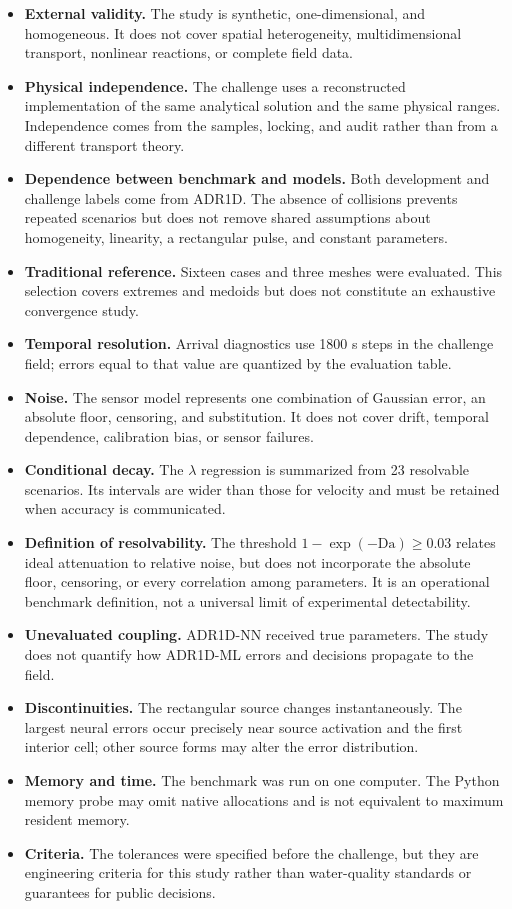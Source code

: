\documentclass[11pt,a4paper]{article}
\begin{document}
\begin{itemize}
    \item \textbf{External validity.} The study is synthetic,
    one-dimensional, and homogeneous. It does not cover spatial heterogeneity,
    multidimensional transport, nonlinear reactions, or complete field data.
    \item \textbf{Physical independence.} The challenge uses a reconstructed
    implementation of the same analytical solution and the same physical
    ranges. Independence comes from the samples, locking, and audit rather than
    from a different transport theory.
    \item \textbf{Dependence between benchmark and models.} Both development
    and challenge labels come from ADR1D. The absence of collisions prevents
    repeated scenarios but does not remove shared assumptions about
    homogeneity, linearity, a rectangular pulse, and constant parameters.
    \item \textbf{Traditional reference.} Sixteen cases and three meshes were
    evaluated. This selection covers extremes and medoids but does not
    constitute an exhaustive convergence study.
    \item \textbf{Temporal resolution.} Arrival diagnostics use 1800 s steps
    in the challenge field; errors equal to that value are quantized by the
    evaluation table.
    \item \textbf{Noise.} The sensor model represents one combination of
    Gaussian error, an absolute floor, censoring, and substitution. It does not
    cover drift, temporal dependence, calibration bias, or sensor failures.
    \item \textbf{Conditional decay.} The $\lambda$ regression is summarized
    from 23 resolvable scenarios. Its intervals are wider than those for
    velocity and must be retained when accuracy is communicated.
    \item \textbf{Definition of resolvability.} The threshold
    $1-\exp(-\mathrm{Da})\geq0.03$ relates ideal attenuation to relative noise,
    but does not incorporate the absolute floor, censoring, or every
    correlation among parameters. It is an operational benchmark definition,
    not a universal limit of experimental detectability.
    \item \textbf{Unevaluated coupling.} ADR1D-NN received true parameters.
    The study does not quantify how ADR1D-ML errors and decisions propagate to
    the field.
    \item \textbf{Discontinuities.} The rectangular source changes
    instantaneously. The largest neural errors occur precisely near source
    activation and the first interior cell; other source forms may alter the
    error distribution.
    \item \textbf{Memory and time.} The benchmark was run on one computer. The
    Python memory probe may omit native allocations and is not equivalent to
    maximum resident memory.
    \item \textbf{Criteria.} The tolerances were specified before the
    challenge, but they are engineering criteria for this study rather than
    water-quality standards or guarantees for public decisions.
\end{itemize}
\end{document}
